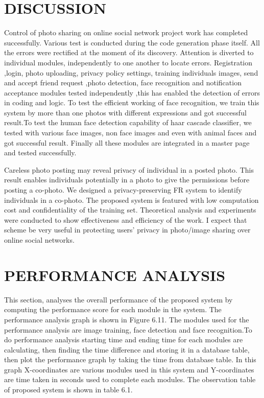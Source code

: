 \section[DISCUSSION]{\fontsize{14}{12}\selectfont DISCUSSION}
Control of photo sharing on online social network project work has completed successfully. Various test is conducted during the code generation phase itself. All the errors were rectified at the moment of its discovery. Attention is diverted to individual modules, independently to one another to locate errors.  Registration ,login, photo uploading, privacy policy settings, training individuals images, send and accept friend request ,photo detection, face recognition  and notification acceptance modules tested independently ,this has enabled the detection of errors in coding and logic. To test the efficient working  of  face recognition, we train this system by more than one photos with different  expressions and got successful result.To test the human face detection capability of haar cascade classifier, we tested with various face images, non face images and even with animal faces and got successful result. Finally all these modules are integrated in a master page and tested successfully.

  \vspace*{1pc}
Careless photo posting may reveal privacy of individual in a posted photo. This result enables individuals potentially in a photo to give the permissions before posting a co-photo. We designed a privacy-preserving FR system to identify individuals in a co-photo. The proposed system is featured with low computation cost and confidentiality of the training set. Theoretical analysis and experiments were conducted to show effectiveness and efficiency of the work. I expect that scheme be very useful in protecting users’ privacy in photo/image sharing over online social networks.

\clearpage
 
 
 
\section[PERFORMANCE ANALYSIS]{\fontsize{14}{12}\selectfont PERFORMANCE ANALYSIS}

This section, analyses the overall performance of the proposed system by computing the
performance score for each module in the system. The performance analysis graph is shown in Figure 6.11. The modules used for the performance analysis  are image training, face detection and face recognition.To do performance analysis  starting time and ending time for each modules are calculating, then finding the time difference and storing it in a database table, then plot the performance graph by taking the time from database table. In this graph X-coordinates are various modules used in this system and Y-coordinates are time taken  in seconds used to complete each modules. The observation table of proposed system is  shown in table 6.1.

